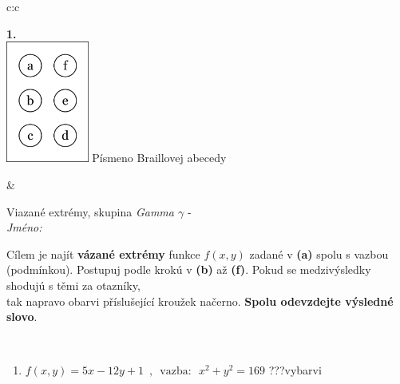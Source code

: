 \documentclass[10pt]{report}
\begin{document}
\begin{tabular}{c:c}
\begin{minipage}[c][104.5mm][t]{0.5\linewidth}
\begin{center}
\begin{minipage}{0.79\linewidth}
\begin{center}
\begin{varwidth}{\linewidth}
\begin{enumerate}
\end{enumerate}
\end{varwidth}
\end{center}
\end{minipage}
\begin{minipage}{0.20\linewidth}
\begin{center}
{\Huge\bfseries 1.} \\[2mm]
\includegraphics[height=40mm]{../images/braille.png}
{\small Písmeno Braillovej abecedy}
\end{center}
\end{minipage}
\end{center}
\end{minipage}
&
\begin{minipage}[c][104.5mm][t]{0.5\linewidth}
\begin{center}
\vspace{7mm}
{\huge Viazané extrémy, skupina \textit{Gamma $\gamma$} -}\\[5mm]
\textit{Jméno:}\phantom{xxxxxxxxxxxxxxxxxxxxxxxxxxxxxxxxxxxxxxxxxxxxxxxxxxxxxxxxxxxxxxxxx}\\[5mm]
\begin{minipage}{0.95\linewidth}
\begin{center}
Cílem je najít \textbf{vázané extrémy} funkce $f(x,y)$ zadané v \textbf{(a)} spolu s vazbou (podmínkou). Postupuj podle krokú v \textbf{(b)} až \textbf{(f)}. Pokud se medzivýsledky shodujú s těmi za otazníky,\\tak napravo obarvi příslušející kroužek načerno. \textbf{Spolu odevzdejte výsledné slovo}.
\end{center}
\end{minipage}
\\[1mm]
\begin{minipage}{0.79\linewidth}
\begin{center}
\begin{varwidth}{\linewidth}
\begin{enumerate}
\normalsize
\item $f(x,y)=5x-12y+1 \enspace , \enspace \mathrm{vazba:} \enspace x^2+y^2=169$\quad \dotfill\; ???\;\dotfill \quad vybarvi

\end{enumerate}
\end{varwidth}
\end{center}
\end{minipage}
\end{center}
\end{minipage}
\end{tabular}
\end{document}
